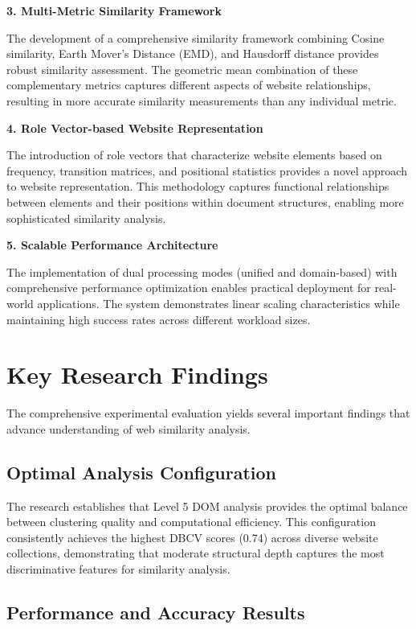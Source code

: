 \textbf{3. Multi-Metric Similarity Framework}

The development of a comprehensive similarity framework combining Cosine similarity, Earth Mover's Distance (EMD), and Hausdorff distance provides robust similarity assessment. The geometric mean combination of these complementary metrics captures different aspects of website relationships, resulting in more accurate similarity measurements than any individual metric.

\textbf{4. Role Vector-based Website Representation}

The introduction of role vectors that characterize website elements based on frequency, transition matrices, and positional statistics provides a novel approach to website representation. This methodology captures functional relationships between elements and their positions within document structures, enabling more sophisticated similarity analysis.

\textbf{5. Scalable Performance Architecture}

The implementation of dual processing modes (unified and domain-based) with comprehensive performance optimization enables practical deployment for real-world applications. The system demonstrates linear scaling characteristics while maintaining high success rates across different workload sizes.

\section{Key Research Findings}
\label{sec:key-findings}

The comprehensive experimental evaluation yields several important findings that advance understanding of web similarity analysis.

\subsection{Optimal Analysis Configuration}
\label{subsec:optimal-configuration}

The research establishes that Level 5 DOM analysis provides the optimal balance between clustering quality and computational efficiency. This configuration consistently achieves the highest DBCV scores (0.74) across diverse website collections, demonstrating that moderate structural depth captures the most discriminative features for similarity analysis.

\subsection{Performance and Accuracy Results}
\label{subsec:performance-accuracy}

